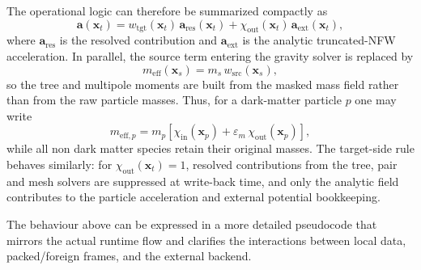 The operational logic can therefore be summarized compactly as
\begin{equation}
\mathbf{a}(\mathbf{x}_t) = w_{\mathrm{tgt}}(\mathbf{x}_t)\,\mathbf{a}_{\mathrm{res}}(\mathbf{x}_t)
+ \chi_{\mathrm{out}}(\mathbf{x}_t)\,\mathbf{a}_{\mathrm{ext}}(\mathbf{x}_t),
\end{equation}
where $\mathbf{a}_{\mathrm{res}}$ is the resolved contribution and $\mathbf{a}_{\mathrm{ext}}$ is the analytic truncated-NFW acceleration. In parallel, the source term entering the gravity solver is replaced by
\begin{equation}
m_{\mathrm{eff}}(\mathbf{x}_s) = m_s\,w_{\mathrm{src}}(\mathbf{x}_s),
\end{equation}
so the tree and multipole moments are built from the masked mass field rather than from the raw particle masses. Thus, for a dark-matter particle $p$ one may write
\begin{equation}
m_{\mathrm{eff},p} = m_p\left[\chi_{\mathrm{in}}(\mathbf{x}_p) + \varepsilon_m\,\chi_{\mathrm{out}}(\mathbf{x}_p)\right],
\end{equation}
while all non dark matter species retain their original masses. The target-side rule behaves similarly: for $\chi_{\mathrm{out}}(\mathbf{x}_t)=1$, resolved contributions from the tree, pair and mesh solvers are suppressed at write-back time, and only the analytic field contributes to the particle acceleration and external potential bookkeeping.

The behaviour above can be expressed in a more detailed pseudocode that mirrors the actual runtime flow and clarifies the interactions between local data, packed/foreign frames, and the external backend.

